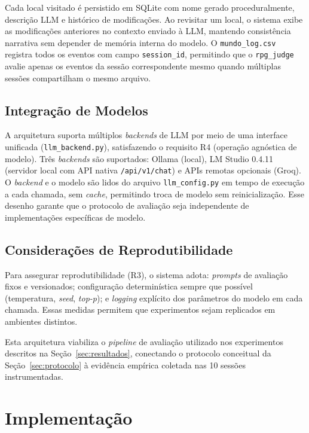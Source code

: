 \documentclass[12pt]{article}
\begin{document}
Cada local visitado é persistido em SQLite com nome gerado proceduralmente, descrição LLM e histórico de modificações. Ao revisitar um local, o sistema exibe as modificações anteriores no contexto enviado à LLM, mantendo consistência narrativa sem depender de memória interna do modelo. O \texttt{mundo\_log.csv} registra todos os eventos com campo \texttt{session\_id}, permitindo que o \texttt{rpg\_judge} avalie apenas os eventos da sessão correspondente mesmo quando múltiplas sessões compartilham o mesmo arquivo.

\subsection{Integração de Modelos}

A arquitetura suporta múltiplos \textit{backends} de LLM por meio de uma interface unificada (\texttt{llm\_backend.py}), satisfazendo o requisito R4 (operação agnóstica de modelo). Três \textit{backends} são suportados: Ollama (local), LM Studio 0.4.11 (servidor local com API nativa \texttt{/api/v1/chat}) e APIs remotas opcionais (Groq). O \textit{backend} e o modelo são lidos do arquivo \texttt{llm\_config.py} em tempo de execução a cada chamada, sem \textit{cache}, permitindo troca de modelo sem reinicialização. Esse desenho garante que o protocolo de avaliação seja independente de implementações específicas de modelo.

\subsection{Considerações de Reprodutibilidade}

Para assegurar reprodutibilidade (R3), o sistema adota: \textit{prompts} de avaliação fixos e versionados; configuração determinística sempre que possível (temperatura, \textit{seed}, \textit{top-p}); e \textit{logging} explícito dos parâmetros do modelo em cada chamada. Essas medidas permitem que experimentos sejam replicados em ambientes distintos.

Esta arquitetura viabiliza o \textit{pipeline} de avaliação utilizado nos experimentos descritos na Seção~\ref{sec:resultados}, conectando o protocolo conceitual da Seção~\ref{sec:protocolo} à evidência empírica coletada nas 10 sessões instrumentadas.

\section{Implementação}
\end{document}
